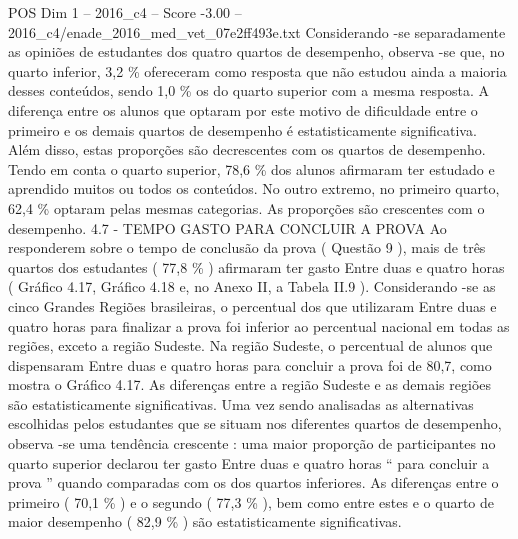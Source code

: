 \begin{textsample}{POS Dim 1 – 2016\_c4 – Score -3.00 – 2016\_c4/enade\_2016\_med\_vet\_07e2ff493e.txt}
Considerando -se separadamente as opiniões de estudantes dos quatro quartos de desempenho, observa -se que, no quarto inferior, 3,2 \% ofereceram como resposta que não estudou ainda a maioria desses conteúdos, sendo 1,0 \% os do quarto superior com a mesma resposta.
A diferença entre os alunos que optaram por este motivo de dificuldade entre o primeiro e os demais quartos de desempenho é estatisticamente significativa.
Além disso, estas proporções são decrescentes com os quartos de desempenho.
Tendo em conta o quarto superior, 78,6 \% dos alunos afirmaram ter estudado e aprendido muitos ou todos os conteúdos.
No outro extremo, no primeiro quarto, 62,4 \% optaram pelas mesmas categorias.
As proporções são crescentes com o desempenho. 4.7 - TEMPO GASTO PARA CONCLUIR A PROVA Ao responderem sobre o tempo de conclusão da prova ( Questão 9 ), mais de três quartos dos estudantes ( 77,8 \% ) afirmaram ter gasto Entre duas e quatro horas ( Gráfico 4.17, Gráfico 4.18 e, no Anexo II, a Tabela II.9 ).
Considerando -se as cinco Grandes Regiões brasileiras, o percentual dos que utilizaram Entre duas e quatro horas para finalizar a prova foi inferior ao percentual nacional em todas as regiões, exceto a região Sudeste.
Na região Sudeste, o percentual de alunos que dispensaram Entre duas e quatro horas para concluir a prova foi de 80,7, como mostra o Gráfico 4.17.
As diferenças entre a região Sudeste e as demais regiões são estatisticamente significativas.
Uma vez sendo analisadas as alternativas escolhidas pelos estudantes que se situam nos diferentes quartos de desempenho, observa -se uma tendência crescente : uma maior proporção de participantes no quarto superior declarou ter gasto Entre duas e quatro horas “ para concluir a prova ” quando comparadas com os dos quartos inferiores.
As diferenças entre o primeiro ( 70,1 \% ) e o segundo ( 77,3 \% ), bem como entre estes e o quarto de maior desempenho ( 82,9 \% ) são estatisticamente significativas.

\end{textsample}
